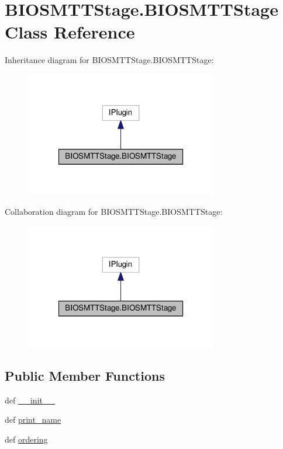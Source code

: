 \hypertarget{class_b_i_o_s_m_t_t_stage_1_1_b_i_o_s_m_t_t_stage}{\section{B\-I\-O\-S\-M\-T\-T\-Stage.\-B\-I\-O\-S\-M\-T\-T\-Stage Class Reference}
\label{class_b_i_o_s_m_t_t_stage_1_1_b_i_o_s_m_t_t_stage}
}


Inheritance diagram for B\-I\-O\-S\-M\-T\-T\-Stage.\-B\-I\-O\-S\-M\-T\-T\-Stage\-:
\nopagebreak
\begin{figure}[H]
\begin{center}
\leavevmode
\includegraphics[width=238pt]{class_b_i_o_s_m_t_t_stage_1_1_b_i_o_s_m_t_t_stage__inherit__graph}
\end{center}
\end{figure}


Collaboration diagram for B\-I\-O\-S\-M\-T\-T\-Stage.\-B\-I\-O\-S\-M\-T\-T\-Stage\-:
\nopagebreak
\begin{figure}[H]
\begin{center}
\leavevmode
\includegraphics[width=238pt]{class_b_i_o_s_m_t_t_stage_1_1_b_i_o_s_m_t_t_stage__coll__graph}
\end{center}
\end{figure}
\subsection*{Public Member Functions}
\begin{DoxyCompactItemize}
\item 
def \hyperlink{class_b_i_o_s_m_t_t_stage_1_1_b_i_o_s_m_t_t_stage_aa5f27b6db5d3b10cbd5d6e47de378e58}{\-\_\-\-\_\-init\-\_\-\-\_\-}
\item 
def \hyperlink{class_b_i_o_s_m_t_t_stage_1_1_b_i_o_s_m_t_t_stage_a4e5d3ca4920bd6825cdda7259fa85d52}{print\-\_\-name}
\item 
def \hyperlink{class_b_i_o_s_m_t_t_stage_1_1_b_i_o_s_m_t_t_stage_ae46a6ddd03499b39c15d164ea3643e48}{ordering}
\end{DoxyCompactItemize}


